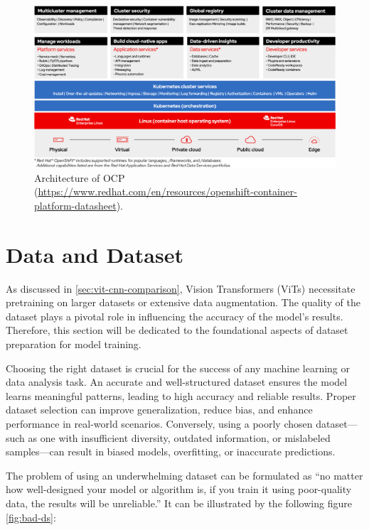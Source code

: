 \begin{figure}[htbp]
    \centering
    \includegraphics[width=\linewidth]{obrazky-figures/02-theoretical-basis/ocp.png}
    \caption{Architecture of OCP (\url{https://www.redhat.com/en/resources/openshift-container-platform-datasheet}).}
    \label{fig:ocp-arch}
\end{figure}

\chapter{Data and Dataset}
\label{chapter:dataanddataset}

As discussed in \autoref{sec:vit-cnn-comparison}, Vision Transformers (ViTs) necessitate pretraining on larger datasets or extensive data augmentation. The quality of the dataset plays a pivotal role in influencing the accuracy of the model's results. Therefore, this section will be dedicated to the foundational aspects of dataset preparation for model training.

\medskip

Choosing the right dataset is crucial for the success of any machine learning or data analysis task. An accurate and well-structured dataset ensures the model learns meaningful patterns, leading to high accuracy and reliable results. Proper dataset selection can improve generalization, reduce bias, and enhance performance in real-world scenarios. Conversely, using a poorly chosen dataset—such as one with insufficient diversity, outdated information, or mislabeled samples—can result in biased models, overfitting, or inaccurate predictions.

The problem of using an underwhelming dataset can be formulated as \enquote{no matter how well-designed your model or algorithm is, if you train it using poor-quality data, the results will be unreliable.} It can be illustrated by the following figure \autoref{fig:bad-ds}:

